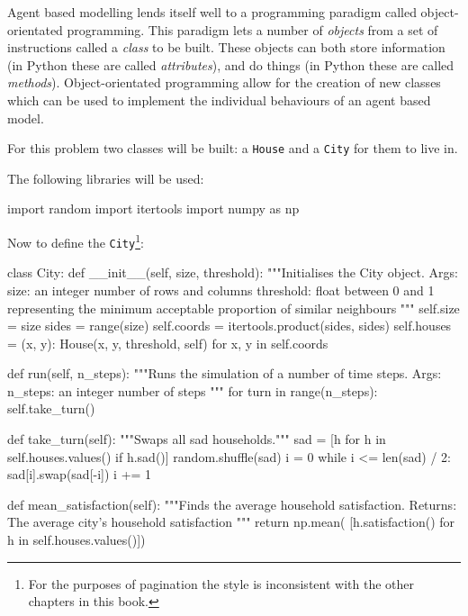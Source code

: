 Agent based modelling lends itself well to a programming paradigm called
object-orientated programming.
This paradigm lets a number of \textit{objects} from a set of instructions
called a \textit{class} to be built.
These objects can both store information (in Python these are called
\textit{attributes}), and do things (in Python these are called
\textit{methods}).
Object-orientated programming allow for the creation of new classes which can be
used to implement the individual behaviours of an agent based model.

For this problem two classes will be built: a
\texttt{House} and a \texttt{City} for them to live in.

The following libraries will be used:

\begin{pyin}
import random
import itertools
import numpy as np
\end{pyin}

Now to define the \texttt{City}\footnote{
For the purposes of pagination the style is inconsistent with the other
chapters in this book.
}:

\begin{pyin}
class City:
    def __init__(self, size, threshold):
        """Initialises the City object.
        Args:
            size: an integer number of rows and columns
            threshold: float between 0 and 1 representing the
            minimum acceptable proportion of similar neighbours
        """
        self.size = size
        sides = range(size)
        self.coords = itertools.product(sides, sides)
        self.houses = {
            (x, y): House(x, y, threshold, self)
            for x, y in self.coords}

    def run(self, n_steps):
        """Runs the simulation of a number of time steps.
        Args:
            n_steps: an integer number of steps
        """
        for turn in range(n_steps):
            self.take_turn()

    def take_turn(self):
        """Swaps all sad households."""
        sad = [h for h in self.houses.values() if h.sad()]
        random.shuffle(sad)
        i = 0
        while i <= len(sad) / 2:
            sad[i].swap(sad[-i])
            i += 1

    def mean_satisfaction(self):
        """Finds the average household satisfaction.
        Returns:
            The average city's household satisfaction
        """
        return np.mean(
            [h.satisfaction() for h in self.houses.values()])
\end{pyin}

